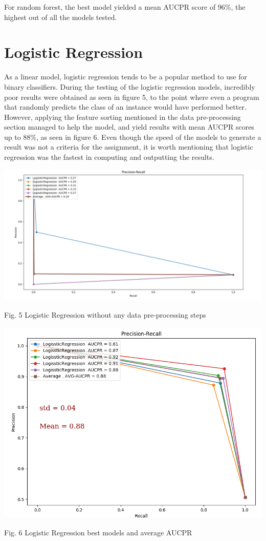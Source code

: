 \documentclass{article}
\begin{document}
For random forest, the best model yielded a mean AUCPR score of 96\%, the highest out of all the models tested. 


\section{Logistic Regression}
As a linear model, logistic regression tends to be a popular method to use for binary classifiers. During the testing of the logistic regression models, incredibly poor results were obtained as seen in figure 5, to the point where even a program that randomly predicts the class of an instance would have performed better. However, applying the feature sorting mentioned in the data pre-processing section managed to help the model, and yield results with mean  AUCPR scores up to 88\%, as seen in figure 6. Even though the speed of the models to generate a result was not a criteria for the assignment, it is worth mentioning that logistic regression was the fastest in computing and outputting the results. 


\begin{center}
\includegraphics[scale=.17]{LOG_WithoutImp.png} %
\end{center}
Fig. 5 Logistic Regression without any data pre-processing steps \\

\begin{center}
\includegraphics[scale=.25]{Logistic_CV.png} %
\end{center}
Fig. 6 Logistic Regression best models and average AUCPR \\
\end{document}
